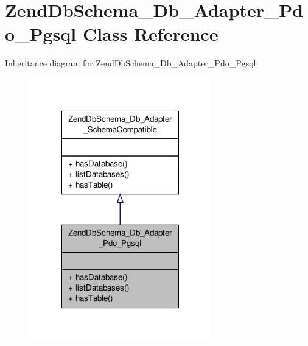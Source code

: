 \hypertarget{classZendDbSchema__Db__Adapter__Pdo__Pgsql}{\section{Zend\-Db\-Schema\-\_\-\-Db\-\_\-\-Adapter\-\_\-\-Pdo\-\_\-\-Pgsql Class Reference}
\label{classZendDbSchema__Db__Adapter__Pdo__Pgsql}
}


Inheritance diagram for Zend\-Db\-Schema\-\_\-\-Db\-\_\-\-Adapter\-\_\-\-Pdo\-\_\-\-Pgsql\-:\nopagebreak
\begin{figure}[H]
\begin{center}
\leavevmode
\includegraphics[width=224pt]{classZendDbSchema__Db__Adapter__Pdo__Pgsql__inherit__graph}
\end{center}
\end{figure}


